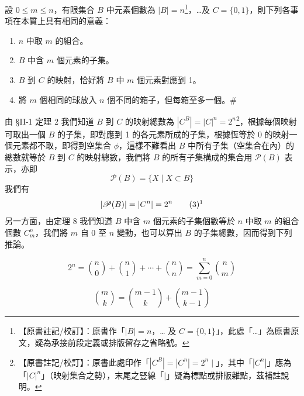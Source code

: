 \medskip
\begin{theorem}\label{thm:b5-2-8}
設 $0 \le m \le n$，有限集合 $B$ 中元素個數為 $|B| = n$\label{note:b5-ch2-p76-thm8-dots}\footnote{【原書註記/校訂】：原書作「$|B| = n$，… 及 $C = \{0, 1\}$」，此處「…」為原書原文，疑為承接前段定義或排版留存之省略號。}，\dots 及 $C = \{0, 1\}$，則下列各事項在本質上具有相同的意義：
\begin{enumerate}[label=(\roman*), topsep=2pt, itemsep=4pt]
  \item $n$ 中取 $m$ 的組合。
  \item $B$ 中含 $m$ 個元素的子集。
  \item $B$ 到 $C$ 的映射，恰好將 $B$ 中 $m$ 個元素對應到 1。
  \item 將 $m$ 個相同的球放入 $n$ 個不同的箱子，但每箱至多一個。\hfill $\#$
\end{enumerate}
\end{theorem}

由 §II-1 定理 2 我們知道 $B$ 到 $C$ 的映射總數為 $|C^B| = |C|^n = 2^n$\label{note:b5-ch2-p77-cb}\footnote{【原書註記/校訂】：原書此處印作「$|C^B| = |C^n| = 2^n \mid$」，其中「$|C^n|$」應為「$|C|^n$」（映射集合之勢），末尾之豎線「$\mid$」疑為標點或排版雜點，茲補註說明。}，根據每個映射可取出一個 $B$ 的子集，即對應到 1 的各元素所成的子集，根據恆等於 0 的映射一個元素都不取，即得到空集合 $\phi$，這樣不難看出 $B$ 中所有子集（空集合在內）的總數就等於 $B$ 到 $C$ 的映射總數，我們將 $B$ 的所有子集構成的集合用 $\mathscr{P}(B)$ 表示，亦即
\[
\mathscr{P}(B) = \{X \mid X \subset B\}
\]
我們有
\label{note:b5-ch2-p77-pn}
\begin{equation}
|\mathscr{P}(B)| = |C^n| = 2^n \tag{3}\footnotemark
\end{equation}
另一方面，由定理 8 我們知道 $B$ 中含 $m$ 個元素的子集個數等於 $n$ 中取 $m$ 的組合個數 $C_m^n$，我們將 $m$ 自 0 至 $n$ 變動，也可以算出 $B$ 的子集總數，因而得到下列推論。

\medskip
\begin{corollary*}
\begin{equation}
2^n = \binom{n}{0} + \binom{n}{1} + \cdots + \binom{n}{n} = \sum_{m=0}^n \binom{n}{m} \tag{4}
\end{equation}
\end{corollary*}

\medskip
\begin{corollary*}
\[
\binom{m}{k} = \binom{m-1}{k} + \binom{m-1}{k-1}
\]
\end{corollary*}
